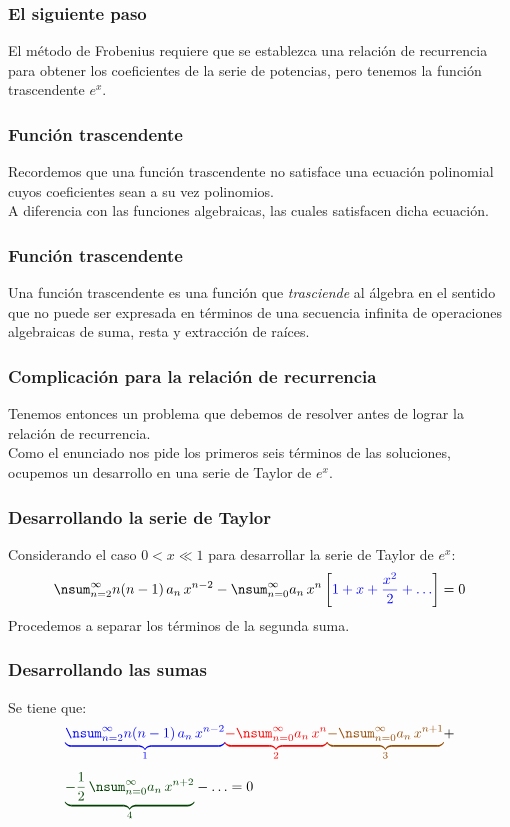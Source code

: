 \documentclass[12pt]{beamer}
\begin{document}
\begin{frame}
\frametitle{El siguiente paso}
El método de Frobenius requiere que se establezca una relación de recurrencia para obtener los coeficientes de la serie de potencias, \pause pero tenemos la función trascendente $e^{x}$.
\end{frame}
\begin{frame}
\frametitle{Función trascendente}
Recordemos que una función trascendente no satisface una ecuación polinomial cuyos coeficientes sean a su vez polinomios.
\\
\bigskip
\pause
A diferencia con las funciones algebraicas, las cuales satisfacen dicha ecuación.
\end{frame}
\begin{frame}
\frametitle{Función trascendente}
Una función trascendente es una función que \emph{trasciende} al álgebra en el sentido que no puede ser expresada en términos de una secuencia infinita de operaciones algebraicas de suma, resta y extracción de raíces.
\end{frame}
\begin{frame}
\frametitle{Complicación para la relación de recurrencia}
Tenemos entonces un problema que debemos de resolver antes de lograr la relación de recurrencia.
\\
\bigskip
\pause
Como el enunciado nos pide los primeros seis términos de las soluciones, \pause ocupemos un desarrollo en una serie de Taylor de $e^{x}$.
\end{frame}
\begin{frame}
\frametitle{Desarrollando la serie de Taylor}
Considerando el caso $0 < x \ll 1$ para desarrollar la serie de Taylor de $e^{x}$:
\pause
\begin{align*}
\nsum_{n=2}^{\infty} n( n - 1) \, a_{n} \, x^{n-2} - \nsum_{n=0}^{\infty} a_{n} \, x^{n} \, \bigg[ \textcolor{blue}{1 + x + \dfrac{x^{2}}{2} + \ldots} \bigg] = 0
\end{align*}
\pause
Procedemos a separar los términos de la segunda suma.  
\end{frame}
\begin{frame}
\frametitle{Desarrollando las sumas}
Se tiene que:
\pause
\begin{align*}
&\textcolor{blue}{\underbrace{\nsum_{n=2}^{\infty} n( n - 1) \, a_{n} \, x^{n-2}}_{1}} \textcolor{red}{\underbrace{- \nsum_{n=0}^{\infty} a_{n} \, x^{n}}_{2}} \textcolor{brown}{\underbrace{- \nsum_{n=0}^{\infty} a_{n} \, x^{n+1}}_{3}}+ \\[0.5em] 
&\textcolor{OliveGreen}{\underbrace{- \dfrac{1}{2} \, \nsum_{n=0}^{\infty} a_{n} \, x^{n+2}}_{4}} - \ldots = 0
\end{align*}
\end{frame}
\end{document}
